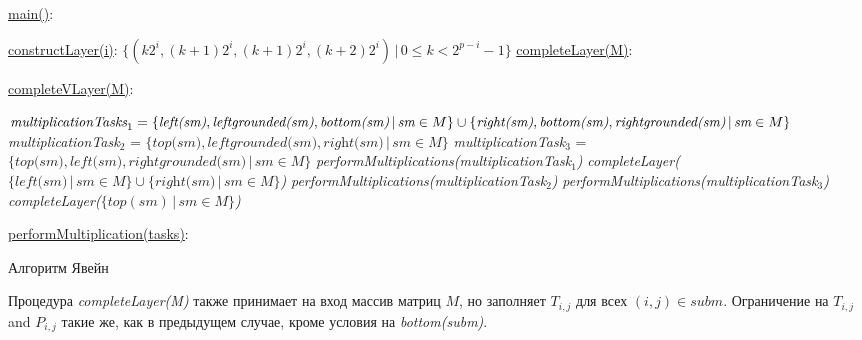 \begin{algorithm}[!h]
\SetAlgoNoLine
{}
\underline{main()}{:}{

 }

\underline{constructLayer(i)}{:}{
 \BlankLine
 $\{(k2^i, (k+1)2^i, (k + 1)2^i, (k+2)2^i) \, |\, 0 \le k < 2^{p - i} - 1\}$
 \BlankLine
    }
\underline{completeLayer(M)}{:}{
\BlankLine
{}
\BlankLine
}

\underline{completeVLayer(M)}{:}{
 \BlankLine
 $\textit{multiplicationTasks}_1 = \linebreak
    \{\textit{left(sm)}, \textit{leftgrounded(sm)}, \textit{bottom(sm)}\,
    |\,\textit{sm} \in M \} \cup \linebreak  \{\textit{right(sm)}, \textit{bottom(sm)}, \textit{rightgrounded(sm)}\, |\,\textit{sm} \in M\}$\;
 \BlankLine
 \textit{multiplicationTask$_2$} = $\{\textit{top(sm)}, \textit{leftgrounded(sm)}, \textit{right(sm)}\, |\,\textit{sm} \in M\}$\;
 \BlankLine
 \textit{multiplicationTask$_3$} = $\{\textit{top(sm)}, \textit{left(sm)}, \textit{rightgrounded(sm)}\, |\,\textit{sm} \in M\}$\;
 \BlankLine
 \textit{performMultiplications(multiplicationTask$_1$)}\;
 \textit{completeLayer($\{\textit{left(sm)}\, |\,sm \in M \} \cup \{\textit{right(sm)}\, |\,\textit{sm} \in M \}$)}\;
 \textit{performMultiplications(multiplicationTask$_2$)}\;
 \textit{performMultiplications(multiplicationTask$_3$)}\;
 \textit{completeLayer($\{top(sm)\, |\,sm \in M \}$)}

 }
 \BlankLine

 \underline{performMultiplication(tasks)}{:}{\\
 }

\caption{Алгоритм Явейн}
\label{algo:modified}
\end{algorithm}

Процедура \textit{completeLayer(M)} также принимает на вход массив матриц $M$, но заполняет $T_{i, j}$ для всех $(i, j) \in subm$.
Ограничение на $T_{i, j}$  and $P_{i, j}$ такие же, как в предыдущем случае, кроме условия на \textit{bottom(subm)}.

